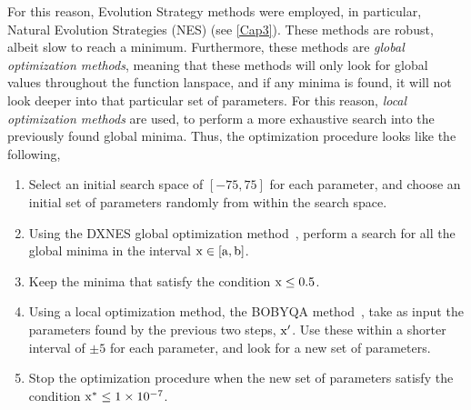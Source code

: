 For this reason, Evolution Strategy methods were employed, in particular, Natural Evolution 
Strategies (NES) (see \autoref{Cap3}). These methods are robust, albeit slow to reach a 
minimum. 
Furthermore, these methods are \emph{global optimization methods}, meaning that these 
methods will only look for global values throughout the function lanspace, and if any 
minima is found, it will not look deeper into that particular set of parameters. For this 
reason, \emph{local optimization methods} are used, to perform a more exhaustive search 
into the previously found global minima. Thus, the optimization procedure looks like the 
following,
\begin{enumerate}
    \item Select an initial search space of \(\left[-75, 75\right]\) for each parameter, and choose an initial set of parameters randomly from within the search space.
    \item Using the DXNES global optimization method~\cite{nomuraDistanceweightedExponentialNatural2021}, perform a search for all the global minima in the interval \(\rm{x} \in \left[a, b\right]\).
    \item Keep the minima that satisfy the condition \(\rm{x} \leq 0.5\).
    \item Using a local optimization method, the BOBYQA method~\cite{powellUOBYQAUnconstrainedOptimization2002}, take as input the parameters found by the previous two steps, \(\rm{x}^{\prime}\). Use these within a shorter interval of \(\pm 5\) for each parameter, and look for a new set of parameters.
    \item Stop the optimization procedure when the new set of parameters satisfy the condition \(\rm{x}^{*} \leq \num{1e-7}\).
\end{enumerate}

